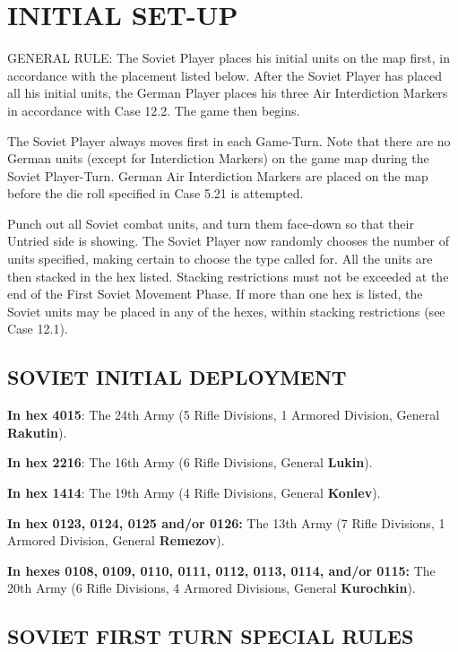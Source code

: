 \section{INITIAL SET-UP}
GENERAL RULE:
The Soviet Player places his initial units on the map first, in accordance with the placement listed below. After the Soviet Player has placed all his initial units, the German Player places his three Air Interdiction Markers in accordance with Case 12.2. The game then begins.

The Soviet Player always moves first in each Game-Turn. Note that there are no German units (except for Interdiction Markers) on the game map during the Soviet Player-Turn. German Air Interdiction Markers are placed on the map before the die roll specified in Case 5.21 is attempted.

Punch out all Soviet combat units, and turn them face-down so that their Untried side is showing. The Soviet Player now randomly chooses the number of units specified, making certain to choose the type called for. All the units are then stacked in the hex listed. Stacking restrictions must not be exceeded at the end of the First Soviet Movement Phase. If more than one hex is listed, the Soviet units may be placed in any of the hexes, within stacking restrictions (see Case 12.1).

\subsection{SOVIET INITIAL DEPLOYMENT}
\textbf{In hex 4015}:
The 24th Army (5 Rifle Divisions, 1 Armored Division, General \textbf{Rakutin}).

\textbf{In hex 2216}:
The 16th Army (6 Rifle Divisions, General \textbf{Lukin}).

\textbf{In hex 1414}:
The 19th Army (4 Rifle Divisions, General \textbf{Konlev}).

\textbf{In hex 0123, 0124, 0125 and/or 0126:}
The 13th Army (7 Rifle Divisions, 1 Armored Division, General \textbf{Remezov}).

\textbf{In hexes 0108, 0109, 0110, 0111, 0112, 0113, 0114, and/or 0115:}
The 20th Army (6 Rifle Divisions, 4 Armored Divisions, General \textbf{Kurochkin}).

\begin{flushleft}
  \subsection{SOVIET FIRST TURN SPECIAL RULES}
\end{flushleft}

